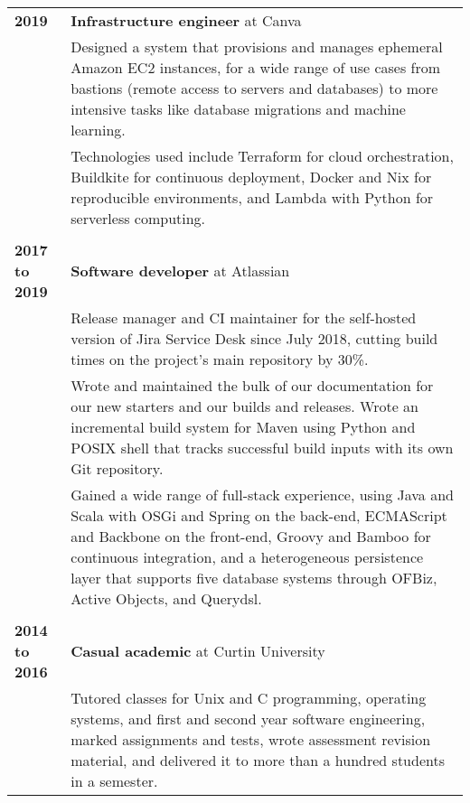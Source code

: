 \documentclass[a4paper,12pt]{article}
\begin{document}
\begin{tabular}{p{35mm}p{125mm}}
	                    \textbf{2019}               & \textbf{Infrastructure engineer} at Canva
	\vspace{0.2em}  \\                              & Designed a system that provisions and manages ephemeral Amazon EC2 instances, for a wide range of use cases from bastions (remote access to servers and databases) to more intensive tasks like database migrations and machine learning.
	\vspace{0.2em}  \\                              & Technologies used include Terraform for cloud orchestration, Buildkite for continuous deployment, Docker and Nix for reproducible environments, and Lambda with Python for serverless computing.
	\\              \\  \textbf{2017 to 2019}       & \textbf{Software developer} at Atlassian
	\vspace{0.2em}  \\                              & Release manager and CI maintainer for the self-hosted version of Jira Service Desk since July 2018, cutting build times on the project’s main repository by 30\%.
	\vspace{0.2em}  \\                              & Wrote and maintained the bulk of our documentation for our new starters and our builds and releases. Wrote an incremental build system for Maven using Python and POSIX shell that tracks successful build inputs with its own Git repository.
	\vspace{0.2em}  \\                              & Gained a wide range of full-stack experience, using Java and Scala with OSGi and Spring on the back-end, ECMAScript and Backbone on the front-end, Groovy and Bamboo for continuous integration, and a heterogeneous persistence layer that supports five database systems through OFBiz, Active Objects, and Querydsl.
	\\              \\  \textbf{2014 to 2016}       & \textbf{Casual academic} at Curtin University
	\vspace{0.2em}  \\                              & Tutored classes for Unix and C programming, operating systems, and first and second year software engineering, marked assignments and tests, wrote assessment revision material, and delivered it to more than a hundred students in a semester.
\end{tabular}
\end{document}
